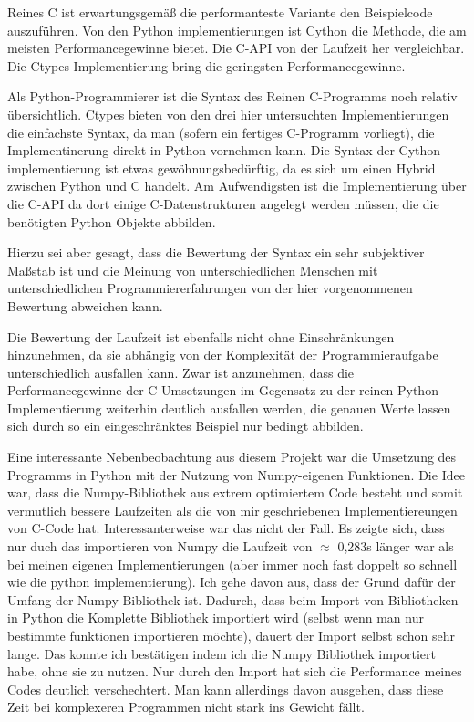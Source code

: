 \documentclass[a4paper, parskip=half]{scrartcl}
\begin{document}
Reines C ist erwartungsgemäß die performanteste Variante den Beispielcode auszuführen. Von den Python implementierungen ist Cython die Methode, die am meisten Performancegewinne bietet. Die C-API von der Laufzeit her vergleichbar. Die Ctypes-Implementierung bring die geringsten Performancegewinne.

Als Python-Programmierer ist die Syntax des Reinen C-Programms noch relativ übersichtlich. Ctypes bieten von den drei hier untersuchten Implementierungen die einfachste Syntax, da man (sofern ein fertiges C-Programm vorliegt), die Implementinerung direkt in Python vornehmen kann. Die Syntax der Cython implementierung ist etwas gewöhnungsbedürftig, da es sich um einen Hybrid zwischen Python und C handelt. Am Aufwendigsten ist die Implementierung über die C-API da dort einige C-Datenstrukturen angelegt werden müssen, die die benötigten Python Objekte abbilden. 

Hierzu sei aber gesagt, dass die Bewertung der Syntax ein sehr subjektiver Maßstab ist und die Meinung von unterschiedlichen Menschen mit unterschiedlichen Programmiererfahrungen von der hier vorgenommenen Bewertung abweichen kann.

Die Bewertung der Laufzeit ist ebenfalls nicht ohne Einschränkungen hinzunehmen, da sie abhängig von der Komplexität der Programmieraufgabe unterschiedlich ausfallen kann. Zwar ist anzunehmen, dass die Performancegewinne der C-Umsetzungen im Gegensatz zu der reinen Python Implementierung weiterhin deutlich ausfallen werden, die genauen Werte lassen sich durch so ein eingeschränktes Beispiel nur bedingt abbilden.

Eine interessante Nebenbeobachtung aus diesem Projekt war die Umsetzung des Programms in Python mit der Nutzung von Numpy-eigenen Funktionen. Die Idee war, dass die Numpy-Bibliothek aus extrem optimiertem Code besteht und somit vermutlich bessere Laufzeiten als die von mir geschriebenen Implementiereungen von C-Code hat. Interessanterweise war das nicht der Fall. Es zeigte sich, dass nur duch das importieren von Numpy die Laufzeit von $\approx$ 0,283s länger war als bei meinen eigenen Implementierungen (aber immer noch fast doppelt so schnell wie die python implementierung). Ich gehe davon aus, dass der Grund dafür der Umfang der Numpy-Bibliothek ist. Dadurch, dass beim Import von Bibliotheken in Python die Komplette Bibliothek importiert wird (selbst wenn man nur bestimmte funktionen importieren möchte), dauert der Import selbst schon sehr lange. Das konnte ich bestätigen indem ich die Numpy Bibliothek importiert habe, ohne sie zu nutzen. Nur durch den Import hat sich die Performance meines Codes deutlich verschechtert. 
Man kann allerdings davon ausgehen, dass diese Zeit bei komplexeren Programmen nicht stark ins Gewicht fällt.
\end{document}
